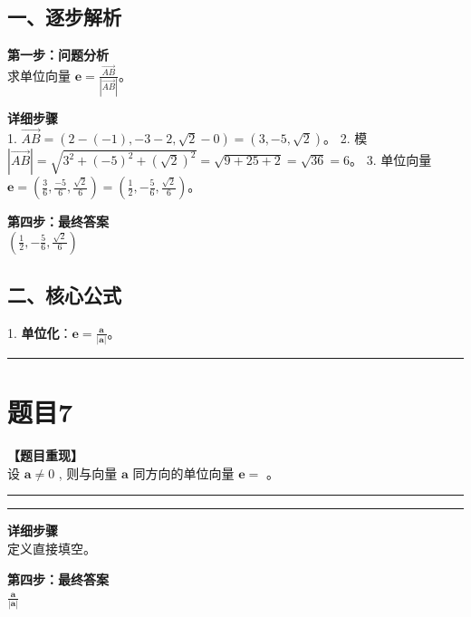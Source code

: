 \documentclass[12pt, a4paper]{ctexart}
\newcommand{\TopSeparator}{
    \par\noindent\rule{\textwidth}{1.5pt}\vspace{0.5em} %
}
\newcommand{\AnalysisSeparator}{
    \par\noindent\rule{\textwidth}{0.5pt}\vspace{0.2em}\hrule\vspace{0.5em} %
}
\newenvironment{RedAnalysis}{
    \par
    \color{red} %
}{
    \par
    \color{black} %
}
\begin{document}
\begin{RedAnalysis}

\subsection*{一、逐步解析}

\textbf{第一步：问题分析} \\
求单位向量 $\mathbf{e} = \frac{\overrightarrow{AB}}{|\overrightarrow{AB}|}$。

\textbf{详细步骤} \\
1. $\overrightarrow{AB} = (2-(-1), -3-2, \sqrt{2}-0) = (3, -5, \sqrt{2})$。
2. 模 $|\overrightarrow{AB}| = \sqrt{3^2 + (-5)^2 + (\sqrt{2})^2} = \sqrt{9+25+2} = \sqrt{36} = 6$。
3. 单位向量 $\mathbf{e} = (\frac{3}{6}, \frac{-5}{6}, \frac{\sqrt{2}}{6}) = (\frac{1}{2}, -\frac{5}{6}, \frac{\sqrt{2}}{6})$。

\textbf{第四步：最终答案} \\
$ (\frac{1}{2}, -\frac{5}{6}, \frac{\sqrt{2}}{6}) $

\subsection*{二、核心公式}
1. \textbf{单位化}：$\mathbf{e} = \frac{\mathbf{a}}{|\mathbf{a}|}$。

\end{RedAnalysis}

\vspace{2em}

\TopSeparator
\section*{题目7}

\textbf{【题目重现】} \\
设 $ \mathbf{a} \neq 0 $ , 则与向量 $\mathbf{a}$ 同方向的单位向量 $ \mathbf{e} = $ \underline{\hspace{2cm}}。

\AnalysisSeparator

\begin{RedAnalysis}

\textbf{详细步骤} \\
定义直接填空。

\textbf{第四步：最终答案} \\
$ \frac{\mathbf{a}}{|\mathbf{a}|} $

\end{RedAnalysis}
\end{document}
